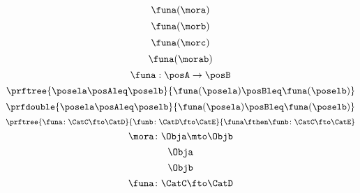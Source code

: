 \begin{forslides}
\begin{forslides}
              \begin{equation}
            \label{eq:slides_Ff}
            \funa(\mora)
        \end{equation}
        \begin{equation}
            \label{eq:slides_Fg}
            \funa(\morb)
        \end{equation}
        \begin{equation}
            \label{eq:slides_Fh}
            \funa(\morc)
        \end{equation}
        \begin{equation}
            \label{eq:slides_Ffg}
            \funa(\morab)
        \end{equation}
        \begin{equation}
            \label{eq:mono1}
            \funa: \posA \to \posB
        \end{equation}
        \begin{equation}
            \label{eq:mono2}
            \prftree{\posela \posAleq \poselb}{\funa(\posela) \posBleq \funa(\poselb)}
        \end{equation}
        \begin{equation}
            \label{eq:mono3}
            \prfdouble{\posela \posAleq \poselb}{\funa(\posela) \posBleq \funa(\poselb)}
        \end{equation}
        \begin{equation}
            \label{eq:functor-composition1}
            \prftree{\funa\colon \CatC \fto \CatD}{\funb\colon\CatD\fto\CatE}{\funa\fthen\funb\colon \CatC \fto \CatE}
        \end{equation}
        \begin{equation}
            \label{eq:slides_mora}
            \mora\colon \Obja\mto\Objb
        \end{equation}
        \begin{equation}
            \label{eq:slides_mora_obja}
            \Obja
        \end{equation}
        \begin{equation}
            \label{eq:slides_mora_objb}
            \Objb
        \end{equation}
        \begin{equation}
            \label{eq:slides_funa}
            \funa\colon\CatC\fto\CatD
        \end{equation}
        \begin{equation}
            \label{eq:slides_ntrafoa}

\end{equation}
\end{forslides}
\end{forslides}
